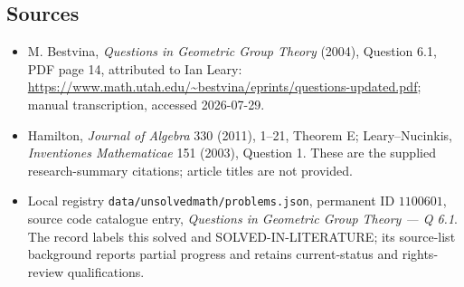 \documentclass[11pt]{article}
\begin{document}
\subsection{Sources}
\begin{itemize}
\item M. Bestvina, \emph{Questions in Geometric Group Theory} (2004), Question 6.1, PDF page 14, attributed to Ian Leary: \url{https://www.math.utah.edu/~bestvina/eprints/questions-updated.pdf}; manual transcription, accessed 2026-07-29.
\item Hamilton, \emph{Journal of Algebra} 330 (2011), 1--21, Theorem E; Leary--Nucinkis, \emph{Inventiones Mathematicae} 151 (2003), Question 1. These are the supplied research-summary citations; article titles are not provided.
\item Local registry \texttt{data/unsolvedmath/problems.json}, permanent ID $1100601$, source code catalogue entry, \emph{Questions in Geometric Group Theory --- Q 6.1}. The record labels this solved and SOLVED-IN-LITERATURE; its source-list background reports partial progress and retains current-status and rights-review qualifications.
\end{itemize}
\end{document}
